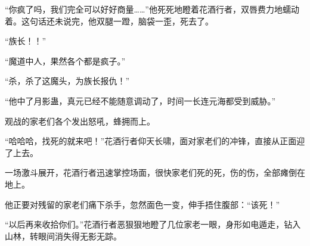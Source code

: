 \begin{this_body}
“你疯了吗，我们完全可以好好商量……”他死死地瞪着花酒行者，双唇费力地蠕动着。这句话还未说完，他双腿一蹬，脑袋一歪，死去了。

“族长！！”

“魔道中人，果然各个都是疯子。”

“杀，杀了这魔头，为族长报仇！”

“他中了月影蛊，真元已经不能随意调动了，时间一长连元海都受到威胁。”

观战的家老们各个发出怒吼，蜂拥而上。

“哈哈哈，找死的就来吧！”花酒行者仰天长啸，面对家老们的冲锋，直接从正面迎了上去。

一场激斗展开，花酒行者迅速掌控场面，很快家老们死的死，伤的伤，全部瘫倒在地上。

他正要对残留的家老们痛下杀手，忽然面色一变，伸手捂住腹部：“该死！”

“以后再来收拾你们。”花酒行者恶狠狠地瞪了几位家老一眼，身形如电遁走，钻入山林，转眼间消失得无影无踪。

\end{this_body}

